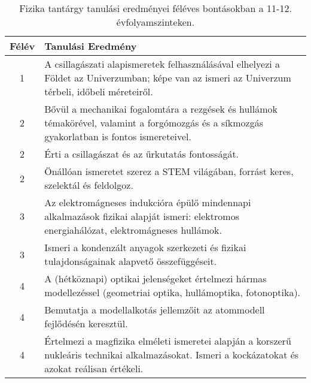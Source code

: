        
           \begin{longtable}{c | p{12cm} }
            \caption[Fizika 11-12.]{Fizika tantárgy tanulási eredményei féléves bontásokban a 11-12. évfolyamszinteken. }  \\

            \textbf{Félév} & \textbf{Tanulási Eredmény} \\
            \hline
            \endhead
                                
                                          1 &  A csillagászati alapismeretek felhasználásával elhelyezi a Földet az Univerzumban; képe van az ismeri az Univerzum térbeli, időbeli méreteiről. \\ \hline
                                      
                                
                                          2 &  Bővül a mechanikai fogalomtára a rezgések és hullámok témakörével, valamint a forgómozgás és a síkmozgás gyakorlatban is fontos ismereteivel. \\ \hline
                                          2 &  Érti a csillagászat és az űrkutatás fontosságát. \\ \hline
                                          2 &  Önállóan ismeretet szerez a STEM világában, forrást keres, szelektál és feldolgoz. \\ \hline
                                      
                                
                                          3 &  Az elektromágneses indukcióra épülő mindennapi alkalmazások fizikai alapját ismeri: elektromos energiahálózat, elektromágneses hullámok. \\ \hline
                                          3 &  Ismeri a kondenzált anyagok szerkezeti és fizikai tulajdonságainak alapvető összefüggéseit. \\ \hline
                                      
                                
                                          4 &  A (hétköznapi) optikai jelenségeket értelmezi hármas modellezéssel (geometriai optika, hullámoptika, fotonoptika). \\ \hline
                                          4 &  Bemutatja a modellalkotás jellemzőit az atommodell fejlődésén keresztül. \\ \hline
                                          4 &  Értelmezi a magfizika elméleti ismeretei alapján a korszerű nukleáris technikai alkalmazásokat. Ismeri a kockázatokat és azokat reálisan értékeli. \\ \hline
                                      
                        \end{longtable}
            \clearpage

